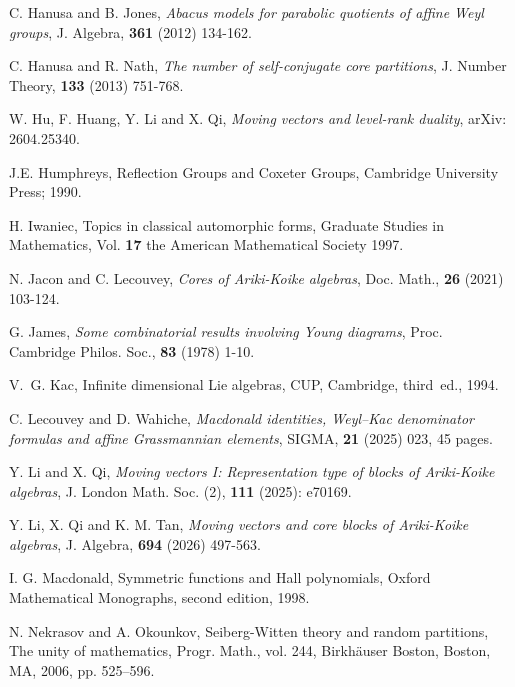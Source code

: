 \documentclass[11pt]{amsart}
\theoremstyle{plain}
\numberwithin{equation}{subsection}
\begin{document}
\begin{thebibliography}{}
 C. Hanusa and B. Jones, {\em Abacus models for parabolic quotients of affine Weyl groups}, J. Algebra, {\bf 361} (2012) 134-162.

 C. Hanusa and R. Nath, {\em The number of self-conjugate core partitions}, J. Number Theory, {\bf 133} (2013) 751-768.

 W. Hu, F. Huang, Y. Li and X. Qi, {\em Moving vectors and level-rank duality}, arXiv: 2604.25340.

  J.E. Humphreys, Reflection Groups and Coxeter Groups, Cambridge University Press; 1990.

 H. Iwaniec, Topics in classical automorphic forms, Graduate Studies in Mathematics, Vol. {\bf 17} the American Mathematical Society 1997.

 N. Jacon and C. Lecouvey, {\em Cores of Ariki-Koike algebras}, Doc. Math., {\bf 26} (2021) 103-124.

 G. James, {\em Some combinatorial results involving Young diagrams}, Proc. Cambridge Philos. Soc., {\bf 83} (1978) 1-10.

 V.~G. Kac, Infinite dimensional Lie algebras, CUP, Cambridge, third~ed., 1994.

 C. Lecouvey and D. Wahiche, {\em Macdonald identities, Weyl–Kac denominator
formulas and affine Grassmannian elements}, SIGMA, {\bf 21} (2025) 023, 45 pages.

 Y. Li and X. Qi, {\em Moving vectors I: Representation type of blocks of Ariki-Koike algebras},
 J. London Math. Soc. (2), {\bf 111} (2025): e70169.

 Y. Li, X. Qi and K. M. Tan, {\em Moving vectors and core blocks of Ariki-Koike algebras},
 J. Algebra, {\bf 694} (2026) 497-563.
 



 I. G. Macdonald, Symmetric functions and Hall polynomials, Oxford Mathematical Monographs, second edition, 1998.

 N. Nekrasov and A. Okounkov, Seiberg-Witten theory and random partitions, The unity of mathematics, Progr. Math., vol. 244,
Birkhäuser Boston, Boston, MA, 2006, pp. 525–596.


\end{thebibliography}
\end{document}
